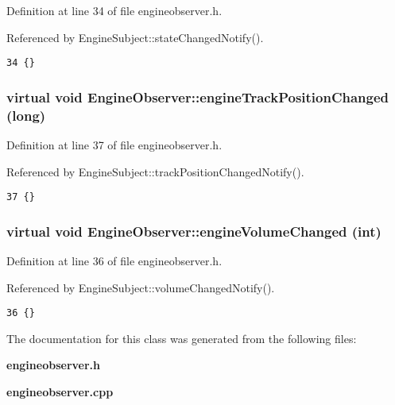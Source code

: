 Definition at line 34 of file engineobserver.h.

Referenced by Engine\-Subject::state\-Changed\-Notify().



\footnotesize\begin{verbatim}34 {}
\end{verbatim}\normalsize 
{}
\subsubsection{\setlength{\rightskip}{0pt plus 5cm}virtual void Engine\-Observer::engine\-Track\-Position\-Changed (long)\hspace{0.3cm}{\tt  [inline, virtual]}}\label{classEngineObserver_EngineObservera5}




Definition at line 37 of file engineobserver.h.

Referenced by Engine\-Subject::track\-Position\-Changed\-Notify().



\footnotesize\begin{verbatim}37 {}
\end{verbatim}\normalsize 
{}
\subsubsection{\setlength{\rightskip}{0pt plus 5cm}virtual void Engine\-Observer::engine\-Volume\-Changed (int)\hspace{0.3cm}{\tt  [inline, virtual]}}\label{classEngineObserver_EngineObservera4}




Definition at line 36 of file engineobserver.h.

Referenced by Engine\-Subject::volume\-Changed\-Notify().



\footnotesize\begin{verbatim}36 {}
\end{verbatim}\normalsize 


The documentation for this class was generated from the following files:\begin{CompactItemize}
\item 
{\bf engineobserver.h}\item 
{\bf engineobserver.cpp}\end{CompactItemize}
